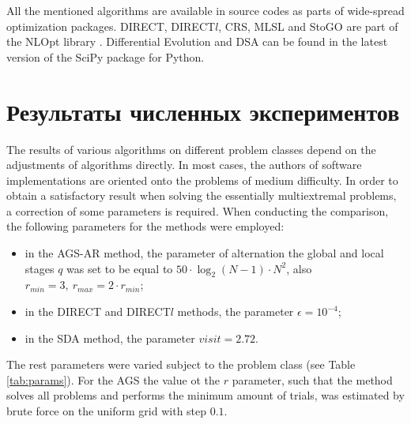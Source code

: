 All the mentioned algorithms are available in source codes as parts of wide-spread optimization packages.
DIRECT, DIRECT$l$, CRS, MLSL and StoGO are part of the NLOpt library \cite{nlopt}.
Differential Evolution and DSA can be found in
the latest version of the SciPy \cite{scipy} package for Python.

\section{Результаты численных экспериментов}
\label{sec:experiments}
The results of various algorithms on different problem classes depend on the adjustments of
algorithms directly. In most cases, the authors of software implementations are oriented onto the
problems of medium difficulty. In order to obtain a satisfactory result when solving the essentially
multiextremal problems, a correction of some parameters is required. When conducting the
comparison, the following parameters for the methods were employed:
\begin{itemize}
  \item in the AGS-AR method, the parameter of alternation the
  global and local stages $q$ was set to be equal to $50\cdot\log_2(N-1)\cdot N^2$, also $r_{min}=3,\:r_{max}=2\cdot r_{min}$;
  \item in the DIRECT and DIRECT\(l\) methods, the parameter \(\epsilon=10^{-4}\);
  \item in the SDA method, the parameter \(visit=2.72\).
\end{itemize}

The rest parameters were varied subject to the problem class (see Table \ref{tab:params}).
For the AGS the value ot the $r$ parameter, such that the method solves all problems and performs the minimum amount of trials,
was estimated by brute force on the uniform grid with step $0.1$.

